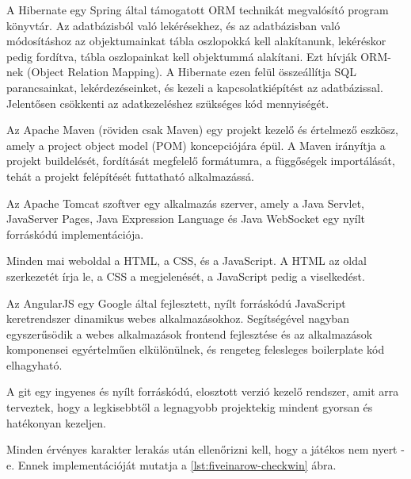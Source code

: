 A Hibernate egy Spring által támogatott ORM technikát megvalósító program könyvtár. Az adatbázisból való lekérésekhez, és az adatbázisban való módosításhoz az objektumainkat tábla oszlopokká kell alakítanunk, lekéréskor pedig fordítva, tábla oszlopainkat kell objektummá alakítani. Ezt hívják ORM-nek (Object Relation Mapping). A Hibernate ezen felül összeállítja SQL parancsainkat, lekérdezéseinket, és kezeli a kapcsolatkiépítést az adatbázissal. Jelentősen csökkenti az adatkezeléshez szükséges kód mennyiségét. \cite{spring}

Az Apache Maven (röviden csak Maven) egy projekt kezelő és értelmező eszkösz, amely a project object model (POM) koncepciójára épül. A Maven irányítja a projekt buildelését, fordítását megfelelő formátumra, a függőségek importálását, tehát a projekt felépítését futtatható alkalmazássá. \cite{maven}

Az Apache Tomcat szoftver egy alkalmazás szerver, amely a Java Servlet, JavaServer Pages, Java Expression Language és Java WebSocket egy nyílt forráskódú implementációja. \cite{tomcat}

Minden mai weboldal a HTML, a CSS, és a JavaScript. A HTML az oldal szerkezetét írja le, a CSS a megjelenését, a JavaScript pedig a viselkedést.

Az AngularJS egy Google által fejlesztett, nyílt forráskódú JavaScript keretrendszer dinamikus webes alkalmazásokhoz. Segítségével nagyban egyszerűsödik a webes alkalmazások frontend fejlesztése és az alkalmazások komponensei egyértelműen elkülönülnek, és rengeteg felesleges boilerplate kód elhagyható. \cite{angularjs}

A git egy ingyenes és nyílt forráskódú, elosztott verzió kezelő rendszer, amit arra terveztek, hogy a legkisebbtől a legnagyobb projektekig mindent gyorsan és hatékonyan kezeljen. \cite{git}





Minden érvényes karakter lerakás után ellenőrizni kell, hogy a játékos nem nyert -e. Ennek implementációját mutatja a \ref{lst:fiveinarow-checkwin} ábra.

